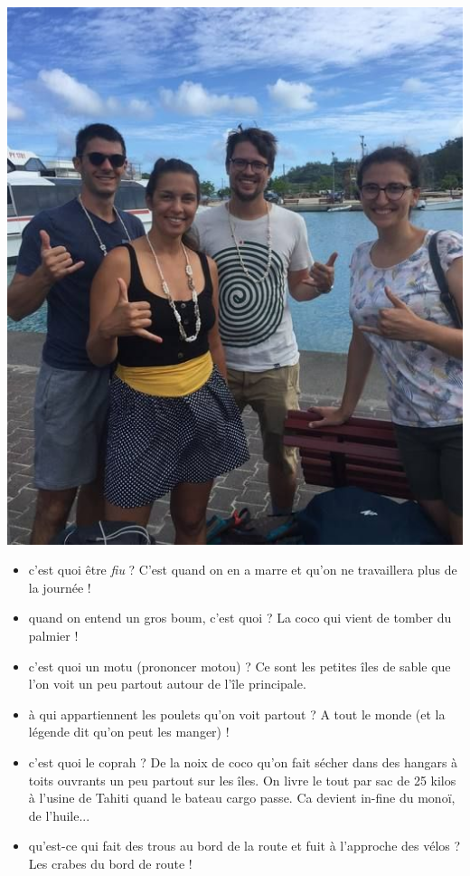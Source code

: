 \includegraphics{images/20180820_hangloose.jpg}

\begin{itemize}
\tightlist
\item
  c'est quoi être \emph{fiu} ? C'est quand on en a marre et qu'on ne
  travaillera plus de la journée !
\item
  quand on entend un gros boum, c'est quoi ? La coco qui vient de tomber
  du palmier !
\item
  c'est quoi un motu (prononcer motou) ? Ce sont les petites îles de
  sable que l'on voit un peu partout autour de l'île principale.
\item
  à qui appartiennent les poulets qu'on voit partout ? A tout le monde
  (et la légende dit qu'on peut les manger) !
\item
  c'est quoi le coprah ? De la noix de coco qu'on fait sécher dans des
  hangars à toits ouvrants un peu partout sur les îles. On livre le tout
  par sac de 25 kilos à l'usine de Tahiti quand le bateau cargo passe.
  Ca devient in-fine du monoï, de l'huile...
\item
  qu'est-ce qui fait des trous au bord de la route et fuit à l'approche
  des vélos ? Les crabes du bord de route !
\end{itemize}

